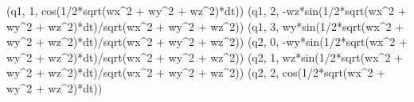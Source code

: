 \documentclass[]{article}
\newenvironment{Shaded}{}{}
\newcommand{\DecValTok}[1]{\textcolor[rgb]{0.25,0.63,0.44}{#1}}
\newcommand{\OperatorTok}[1]{\textcolor[rgb]{0.40,0.40,0.40}{#1}}
\newcommand{\NormalTok}[1]{#1}
\begin{document}
\begin{Shaded}
\begin{Highlighting}[]
\NormalTok{(q1, }\DecValTok{1}\NormalTok{, cos(}\DecValTok{1}\OperatorTok{/}\DecValTok{2}\OperatorTok{*}\NormalTok{sqrt(wx}\OperatorTok{^}\DecValTok{2} \OperatorTok{+}\NormalTok{ wy}\OperatorTok{^}\DecValTok{2} \OperatorTok{+}\NormalTok{ wz}\OperatorTok{^}\DecValTok{2}\NormalTok{)}\OperatorTok{*}\NormalTok{dt))}
\NormalTok{(q1, }\DecValTok{2}\NormalTok{, }\OperatorTok{-}\NormalTok{wz}\OperatorTok{*}\NormalTok{sin(}\DecValTok{1}\OperatorTok{/}\DecValTok{2}\OperatorTok{*}\NormalTok{sqrt(wx}\OperatorTok{^}\DecValTok{2} \OperatorTok{+}\NormalTok{ wy}\OperatorTok{^}\DecValTok{2} \OperatorTok{+}\NormalTok{ wz}\OperatorTok{^}\DecValTok{2}\NormalTok{)}\OperatorTok{*}\NormalTok{dt)}\OperatorTok{/}\NormalTok{sqrt(wx}\OperatorTok{^}\DecValTok{2} \OperatorTok{+}\NormalTok{ wy}\OperatorTok{^}\DecValTok{2} \OperatorTok{+}\NormalTok{ wz}\OperatorTok{^}\DecValTok{2}\NormalTok{))}
\NormalTok{(q1, }\DecValTok{3}\NormalTok{, wy}\OperatorTok{*}\NormalTok{sin(}\DecValTok{1}\OperatorTok{/}\DecValTok{2}\OperatorTok{*}\NormalTok{sqrt(wx}\OperatorTok{^}\DecValTok{2} \OperatorTok{+}\NormalTok{ wy}\OperatorTok{^}\DecValTok{2} \OperatorTok{+}\NormalTok{ wz}\OperatorTok{^}\DecValTok{2}\NormalTok{)}\OperatorTok{*}\NormalTok{dt)}\OperatorTok{/}\NormalTok{sqrt(wx}\OperatorTok{^}\DecValTok{2} \OperatorTok{+}\NormalTok{ wy}\OperatorTok{^}\DecValTok{2} \OperatorTok{+}\NormalTok{ wz}\OperatorTok{^}\DecValTok{2}\NormalTok{))}
\NormalTok{(q2, }\DecValTok{0}\NormalTok{, }\OperatorTok{-}\NormalTok{wy}\OperatorTok{*}\NormalTok{sin(}\DecValTok{1}\OperatorTok{/}\DecValTok{2}\OperatorTok{*}\NormalTok{sqrt(wx}\OperatorTok{^}\DecValTok{2} \OperatorTok{+}\NormalTok{ wy}\OperatorTok{^}\DecValTok{2} \OperatorTok{+}\NormalTok{ wz}\OperatorTok{^}\DecValTok{2}\NormalTok{)}\OperatorTok{*}\NormalTok{dt)}\OperatorTok{/}\NormalTok{sqrt(wx}\OperatorTok{^}\DecValTok{2} \OperatorTok{+}\NormalTok{ wy}\OperatorTok{^}\DecValTok{2} \OperatorTok{+}\NormalTok{ wz}\OperatorTok{^}\DecValTok{2}\NormalTok{))}
\NormalTok{(q2, }\DecValTok{1}\NormalTok{, wz}\OperatorTok{*}\NormalTok{sin(}\DecValTok{1}\OperatorTok{/}\DecValTok{2}\OperatorTok{*}\NormalTok{sqrt(wx}\OperatorTok{^}\DecValTok{2} \OperatorTok{+}\NormalTok{ wy}\OperatorTok{^}\DecValTok{2} \OperatorTok{+}\NormalTok{ wz}\OperatorTok{^}\DecValTok{2}\NormalTok{)}\OperatorTok{*}\NormalTok{dt)}\OperatorTok{/}\NormalTok{sqrt(wx}\OperatorTok{^}\DecValTok{2} \OperatorTok{+}\NormalTok{ wy}\OperatorTok{^}\DecValTok{2} \OperatorTok{+}\NormalTok{ wz}\OperatorTok{^}\DecValTok{2}\NormalTok{))}
\NormalTok{(q2, }\DecValTok{2}\NormalTok{, cos(}\DecValTok{1}\OperatorTok{/}\DecValTok{2}\OperatorTok{*}\NormalTok{sqrt(wx}\OperatorTok{^}\DecValTok{2} \OperatorTok{+}\NormalTok{ wy}\OperatorTok{^}\DecValTok{2} \OperatorTok{+}\NormalTok{ wz}\OperatorTok{^}\DecValTok{2}\NormalTok{)}\OperatorTok{*}\NormalTok{dt))}

\end{Highlighting}
\end{Shaded}
\end{document}
